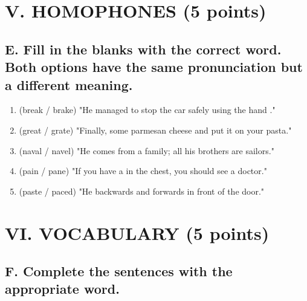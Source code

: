 \documentclass[11pt,a4paper]{article}
\begin{document}
\vspace{0.5cm}

\section{V. HOMOPHONES (5 points)}

\subsection{E. Fill in the blanks with the correct word. Both options have the same pronunciation but a different meaning.}

\begin{enumerate}
    \item (break / brake) "He managed to stop the car safely using the hand \underline{\hspace{3cm}}."
    \item (great / grate) "Finally, \underline{\hspace{3cm}} some parmesan cheese and put it on your pasta."
    \item (naval / navel) "He comes from a \underline{\hspace{3cm}} family; all his brothers are sailors."
    \item (pain / pane) "If you have a \underline{\hspace{3cm}} in the chest, you should see a doctor."
    \item (paste / paced) "He \underline{\hspace{3cm}} backwards and forwards in front of the door."
\end{enumerate}

\vspace{0.5cm}

\section{VI. VOCABULARY (5 points)}

\subsection{F. Complete the sentences with the appropriate word.}
\end{document}
